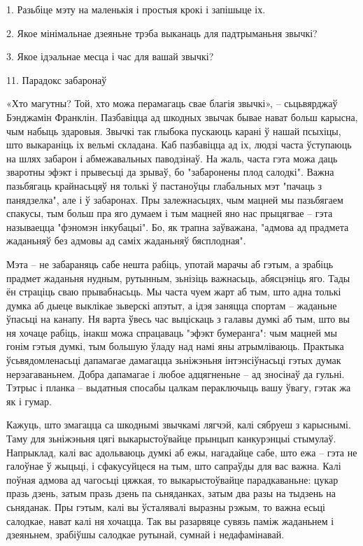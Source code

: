 1. Разьбіце мэту на маленькія і простыя крокі і запішыце іх.

2. Якое мінімальнае дзеяньне трэба выканаць для падтрыманьня звычкі?

3. Якое ідэальнае месца і час для вашай звычкі?


11. Парадокс забаронаў

«Хто магутны? Той, хто можа перамагаць свае благія звычкі», – сьцьвярджаў Бэнджамін Франклін. Пазбавіцца ад шкодных звычак бывае нават больш карысна, чым набыць здаровыя. Звычкі так глыбока пускаюць карані ў нашай псыхіцы, што выкараніць іх вельмі складана. Каб пазбавіцца ад іх, людзі часта ўступаюць на шлях забарон і абмежавальных паводзінаў. На жаль, часта гэта можа даць зваротны эфэкт і прывесьці да зрываў, бо "забаронены плод салодкі". Важна пазьбягаць крайнасьцяў ня толькі ў пастаноўцы глабальных мэт "пачаць з панядзелка", але і ў забаронах. Пры залежнасьцях, чым мацней мы пазьбягаем спакусы, тым больш пра яго думаем і тым мацней яно нас прыцягвае – гэта называецца "фэномэн інкубацыі". Бо, як трапна заўважана, "адмова ад прадмета жаданьняў без адмовы ад саміх жаданьняў бясплодная". 

Мэта – не забараняць сабе нешта рабіць, употай марачы аб гэтым, а зрабіць прадмет жаданьня нудным, рутынным, зьнізіць важнасьць, абясцэніць яго. Тады ён страціць сваю прывабнасьць. Мы часта чуем жарт аб тым, што адна толькі думка аб дыеце выклікае зьверскі апэтыт, а ідэя заняцца спортам – жаданьне ўпасьці на канапу. Ня варта ўвесь час выціскаць з галавы думкі аб тым, што вы ня хочаце рабіць, інакш можа спрацаваць "эфэкт бумеранга": чым мацней мы гонім гэтыя думкі, тым большую ўладу над намі яны атрымліваюць. Практыка ўсьвядомленасьці дапамагае дамагацца зьніжэньня інтэнсіўнасьці гэтых думак нерэагаваньнем. Добра дапамагае і любое адцягненьне – ад зносінаў да гульні. Тэтрыс і планка – выдатныя спосабы цалкам пераключыць вашу ўвагу, гэтак жа як і гумар.

Кажуць, што змагацца са шкоднымі звычкамі лягчэй, калі сябруеш з карыснымі. Таму для зьніжэньня цягі выкарыстоўвайце прынцып канкурэнцыі стымулаў. Напрыклад, калі вас адольваюць думкі аб ежы, нагадайце сабе, што ежа – гэта не галоўнае ў жыцьці, і сфакусуйцеся на тым, што сапраўды для вас важна. Калі поўная адмова ад чагосьці цяжкая, то выкарыстоўвайце парадкаваньне: цукар празь дзень, затым празь дзень па сьняданках, затым два разы на тыдзень на сьняданак. Пры гэтым, калі вы ўсталявалі выразны рэжым, то важна есьці салодкае, нават калі ня хочацца. Так вы разарвяце сувязь паміж жаданьнем і дзеяньнем, зрабіўшы салодкае рутынай, сумнай і недафамінавай.

